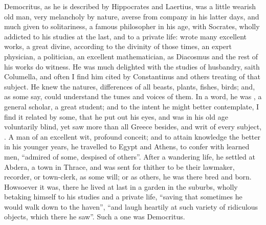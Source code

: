 Democritus, as he is described by Hippocrates and
Laertius, was a little wearish old man, very melancholy by
nature, averse from company in his latter days, and much
given to solitariness, a famous philosopher in his age,
 with Socrates, wholly
addicted to his studies at the last, and to a private life: wrote many
excellent works, a great divine, according to the divinity of those times, an
expert physician, a politician, an excellent mathematician, as
Diacosmus and the rest of his works do witness. He was much
delighted with the studies of husbandry, saith Columella,
and often I find him cited by Constantinus and others
treating of that subject. He knew the natures, differences of all beasts,
plants, fishes, birds; and, as some say, could understand
the tunes and voices of them. In a word, he was , a
general scholar, a great student; and to the intent he might better
contemplate, I find it related by some, that he put out his
eyes, and was in his old age voluntarily blind, yet saw more than all Greece
besides, and writ of every subject, . A man of an
excellent wit, profound conceit; and to attain knowledge the better in his
younger years, he travelled to Egypt and Athens, to confer
with learned men, \enquote{admired of some, despised of others}.
After a wandering life, he settled at Abdera, a town in Thrace, and was sent
for thither to be their lawmaker, recorder, or town-clerk, as some will; or as
others, he was there bred and born. Howsoever it was, there he lived at last in
a garden in the suburbs, wholly betaking himself to his studies and a private
life, \enquote{saving that sometimes he would walk down to the
haven}, \enquote{and laugh heartily at such variety of ridiculous
objects, which there he saw}. Such a one was Democritus.

